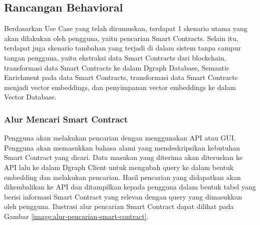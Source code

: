 \subsection{Rancangan Behavioral}

Berdasarkan Use Case yang telah dirumuskan, terdapat 1 skenario utama yang akan dilakukan oleh pengguna, yaitu pencarian Smart Contracts. Selain itu, terdapat juga skenario tambahan yang terjadi di dalam sistem tanpa campur tangan pengguna, yaitu ekstraksi data Smart Contracts dari blockchain, transformasi data Smart Contracts ke dalam Dgraph Database, Semantic Enrichment pada data Smart Contracts, transformasi data Smart Contracts menjadi vector embeddings, dan penyimpanan vector embeddings ke dalam Vector Database.

\subsubsection{Alur Mencari Smart Contract}

Pengguna akan melakukan pencarian dengan menggunakan API atau GUI. Pengguna akan memasukkan bahasa alami yang mendeskripsikan kebutuhan Smart Contract yang dicari. Data masukan yang diterima akan diteruskan ke API lalu ke dalam Dgraph Client untuk mengubah query ke dalam bentuk embedding dan melakukan pencarian. Hasil pencarian yang didapatkan akan dikembalikan ke API dan ditampilkan kepada pengguna dalam bentuk tabel yang berisi informasi Smart Contract yang relevan dengan query yang dimasukkan oleh pengguna. Ilustrasi alur pencarian Smart Contract dapat dilihat pada Gambar \ref{image:alur-pencarian-smart-contract}.


